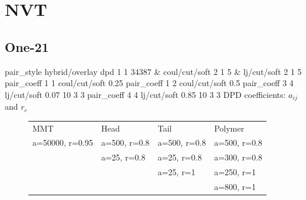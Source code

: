 \documentclass[a4paper]{article}
\begin{document}
\section*{NVT}


\subsection*{One-21}
pair\_style hybrid/overlay dpd 1 1 34387 \& coul/cut/soft 2 1 5 \& 
lj/cut/soft 2 1 5\newline
pair\_coeff 1 1 coul/cut/soft 0.25
pair\_coeff 1 2 coul/cut/soft 0.5\newline
pair\_coeff 3 4 lj/cut/soft 0.07    10 3 3\newline
pair\_coeff 4 4 lj/cut/soft 0.85    10 3 3\newline
DPD coefficients: $a_{ij}$ and $r_c$
\begin{figure}[H]\begin{tabular}{llll}
MMT             & Head         & Tail         & Polymer      \\
a=50000, r=0.95 & a=500, r=0.8 & a=500, r=0.8 & a=500, r=0.8 \\
                & a=25,  r=0.8 & a=25,  r=0.8 & a=300, r=0.8 \\
                &              & a=25,  r=1   & a=250, r=1   \\
                &              &              & a=800, r=1   \\
\end{tabular}\end{figure}
\end{document}
